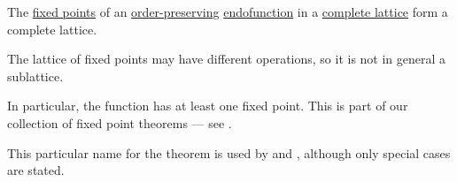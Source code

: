 \begin{theorem}\label{thm:knaster_tarski_theorem}
  The \hyperref[def:function_fixed_point]{fixed points} of an \hyperref[def:order_function]{order-preserving} \hyperref[def:function/endofunction]{endofunction} in a \hyperref[def:complete_lattice]{complete lattice} form a complete lattice.
\end{theorem}
\begin{comments}
  \item The lattice of fixed points may have different operations, so it is not in general a sublattice.

  \item In particular, the function has at least one fixed point. This is part of our collection of fixed point theorems --- see .

  \item This particular name for the theorem is used by  and , although only special cases are stated.
\end{comments}
